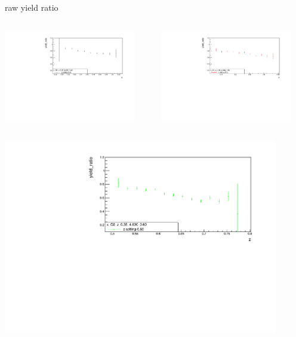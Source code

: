 \begin{frame}{raw yield ratio}
\begin{columns}
\begin{column}[T]{0.5\textwidth}
\includegraphics[width = 0.9\textwidth]{results/yield/statistics/x_Q2_z_0.35_4.000_0.40_ratio.pdf}
\end{column}
\begin{column}[T]{0.5\textwidth}
\includegraphics[width = 0.9\textwidth]{results/yield/statistics/x_Q2_z_0.35_4.000_0.50_ratio.pdf}
\end{column}
\end{columns}
\begin{columns}
\begin{column}[T]{0.5\textwidth}
\includegraphics[width = 0.9\textwidth]{results/yield/statistics/x_Q2_z_0.35_4.000_0.60_ratio.pdf}

\end{column}
\end{columns}
\end{frame}
